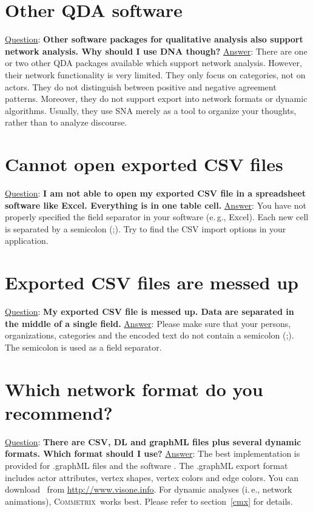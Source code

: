 \documentclass[12pt,a4paper]{scrreprt}
\newcommand{\visone}
{\textsf%
 {\protect\raisebox{.5ex}{\color[rgb]{0.1,0.1,0.1}v}%
  \protect\raisebox{.1ex}{\color[rgb]{0.3,0.3,0.3}i}%
  \protect\raisebox{-.1ex}{\color[rgb]{0.1,0.1,0.1}s}%
  \protect\raisebox{.1ex}{\color[rgb]{0.3,0.3,0.3}o}%
  \protect\raisebox{-.1ex}{\color[rgb]{0.1,0.1,0.1}n}%
  \protect\raisebox{-.4ex}{\color[rgb]{0.3,0.3,0.3}e}%
 }%
}
\newcommand{\commetrix}{\textsc{Commetrix}}
\begin{document}
\section{Other QDA software}
\underline{Question}: \textbf{Other software packages for qualitative analysis also support network analysis. Why should I use DNA though?}
\vspace{0.3cm} \newline
\underline{Answer}: There are one or two other QDA packages available which support network analysis. However, their network functionality is very limited. They only focus on categories, not on actors. They do not distinguish between positive and negative agreement patterns. Moreover, they do not support export into network formats or dynamic algorithms. Usually, they use SNA merely as a tool to organize your thoughts, rather than to analyze discourse.

\section{Cannot open exported CSV files}
\underline{Question}: \textbf{I am not able to open my exported CSV file in a spreadsheet software like Excel. Everything is in one table cell.}
\vspace{0.3cm} \newline
\underline{Answer}: You have not properly specified the field separator in your software (e.\,g., Excel). Each new cell is separated by a semicolon (;). Try to find the CSV import options in your application.

\section{Exported CSV files are messed up}
\underline{Question}: \textbf{My exported CSV file is messed up. Data are separated in the middle of a single field.}
\vspace{0.3cm} \newline
\underline{Answer}: Please make sure that your persons, organizations, categories and the encoded text do not contain a semicolon (;). The semicolon is used as a field separator.

\section{Which network format do you recommend?}
\underline{Question}: \textbf{There are CSV, DL and graphML files plus several dynamic formats. Which format should I use?}
\vspace{0.3cm} \newline
\underline{Answer}: The best implementation is provided for .graphML files and the software \visone. The .graphML export format includes actor attributes, vertex shapes, vertex colors and edge colors. You can download \visone\ from \url{http://www.visone.info}. For dynamic analyses (i.\,e., network animations), \commetrix\ works best. Please refer to section~\ref{cmx} for details.
\end{document}
